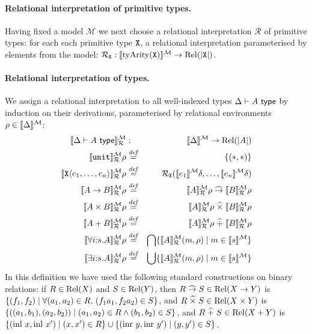 
\paragraph{Relational interpretation of primitive types.}
Having fixed a model $\mathcal{M}$ we next choose a relational interpretation $\mathcal{R}$ of
primitive types: for each each primitive type
$\tyPrimNm{X}$, a relational interpretation parameterised by elements
from the model: $\mathcal{R}_{\tyPrimNm{X}} :
\semSort{\primTyArity(\tyPrimNm{X})}M \to \Rel(\tyPrimSem{\tyPrimNm{X}})$. 

\begin{example*}
\end{example*}

\paragraph{Relational interpretation of types.}
We assign a relational interpretation to all well-indexed types $\Delta
\vdash A \isType$ by induction on their derivations, parameterised by
relational environments 
$\rho \in \semSort{\Delta}M$:
\begin{eqnarray*}
  \rsem{\Delta \vdash A \isType}M R & : & \semSort\Delta M \to \Rel(\tyPrimSem{A})\\
  \rsem{\tyUnit}M R \rho & \isDefinedAs & \{(*,*)\} \\
  \rsem{\tyPrim{X}{e_1,\ldots,e_n}} M R\rho & \isDefinedAs & 
  \mathcal{R}_{\tyPrimNm{X}} (\semIndexExp{e_1}M\delta, \ldots,
  \semIndexExp{e_n}M\delta)\\
  \rsem{A \tyArr B}M R \rho & \isDefinedAs & \rsem{A}M R \rho \relArrow \rsem{B} M R \rho \\
  \rsem{A \tyProduct B} M R \rho & \isDefinedAs & \rsem{A} M R \rho \relTimes \rsem{B} M R \rho \\
  \rsem{A + B}M R \rho & \isDefinedAs & \rsem{A} M R \rho \relSum \rsem{B} M R \rho \\
  \rsem{\forall i\mathord:s.A} M R \rho & \isDefinedAs & 
  \bigcap\{ \rsem{A} M R {(m,\rho)} \sepbar m \in \semSort{s}M \} \\
  \rsem{\exists i\mathord:s.A} M R \rho & \isDefinedAs & 
  \bigcup\{ \rsem{A} M R {(m,\rho)} \sepbar m \in \semSort{s}M \}
\end{eqnarray*}
In this definition we have used the following standard %
constructions on binary relations: if $R \in \Rel(X)$ and $S \in
\Rel(Y)$, then $R \relArrow S \in \Rel(X \to Y)$ is %
$\{(f_1,f_2) \sepbar \forall (a_1,a_2) \in R.\ (f_1a_1,f_2a_2) \in S
\}$, and %
$R
\relTimes S \in \Rel(X \times Y)$ is %
$\{((a_1,b_1),(a_2,b_2)) \sepbar (a_1,a_2) \in R \land (b_1,b_2) \in S
\}$, and %
$R \relSum S \in \Rel(X + Y)$ is %
$\{ (\mathrm{inl}\ x, \mathrm{inl}\ x') \sepbar (x,x') \in R \} \cup
\{ (\mathrm{inr}\ y, \mathrm{inr}\ y') \sepbar (y,y') \in S \}$.

